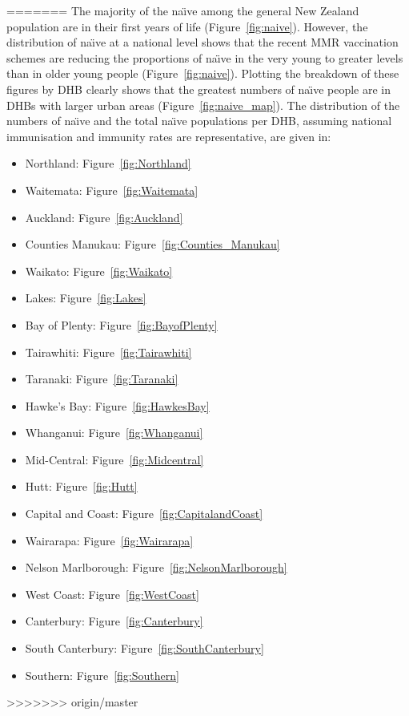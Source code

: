 \documentclass{article}
\begin{document}
\begin{itemize}
=======
The majority of the na\"{\i}ve among the general New Zealand population are in their first years of life (Figure~\ref{fig:naive}). However, the distribution of na\"{\i}ve at a national level shows that the recent MMR vaccination schemes are reducing the proportions of na\"{\i}ve in the very young to greater levels than in older young people  (Figure~\ref{fig:naive}). Plotting the breakdown of these figures by DHB clearly shows that the greatest numbers of na\"{\i}ve people are in DHBs with larger urban areas (Figure~\ref{fig:naive_map}). The distribution of the numbers of na\"{\i}ve and the total na\"{\i}ve populations per DHB, assuming national immunisation and immunity rates are representative, are given in:
\begin{itemize}[noitemsep,nolistsep]
\item Northland: Figure~\ref{fig:Northland}
\item Waitemata: Figure~\ref{fig:Waitemata}
\item Auckland: Figure~\ref{fig:Auckland}
\item Counties Manukau: Figure~\ref{fig:Counties_Manukau}
\item Waikato: Figure~\ref{fig:Waikato}
\item Lakes: Figure~\ref{fig:Lakes}
\item Bay of Plenty: Figure~\ref{fig:BayofPlenty}
\item Tairawhiti: Figure~\ref{fig:Tairawhiti}
\item Taranaki: Figure~\ref{fig:Taranaki}
\item Hawke's Bay: Figure~\ref{fig:HawkesBay}
\item Whanganui: Figure~\ref{fig:Whanganui}
\item Mid-Central: Figure~\ref{fig:Midcentral}
\item Hutt: Figure~\ref{fig:Hutt}
\item Capital and Coast: Figure~\ref{fig:CapitalandCoast}
\item Wairarapa: Figure~\ref{fig:Wairarapa}
\item Nelson Marlborough: Figure~\ref{fig:NelsonMarlborough}
\item West Coast: Figure~\ref{fig:WestCoast}
\item Canterbury: Figure~\ref{fig:Canterbury}
\item South Canterbury: Figure~\ref{fig:SouthCanterbury}
\item Southern: Figure~\ref{fig:Southern}
\end{itemize}
>>>>>>> origin/master



\end{itemize}
\end{document}
